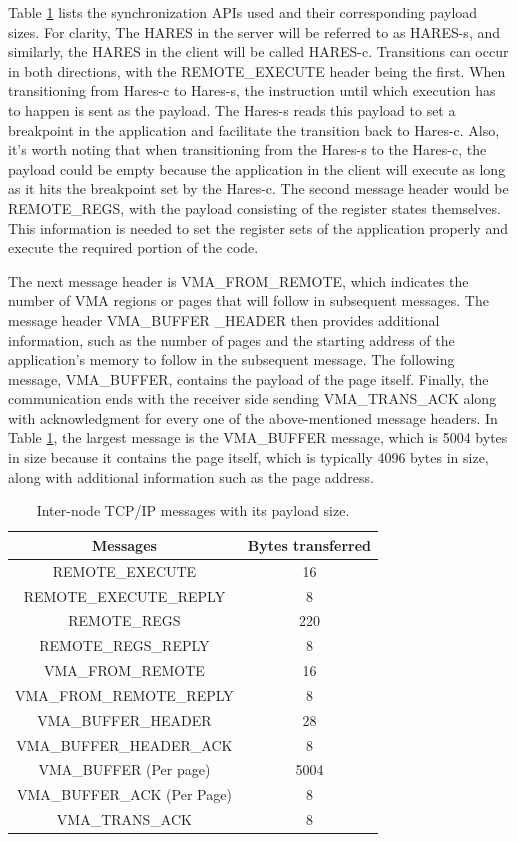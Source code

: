 \documentclass[article, doublespace,nopageskip]{VTthesis} %
\newcommand{\monitor}{HARES }
\begin{document}
    Table \ref{t:TPayload} lists the synchronization APIs used and their corresponding payload sizes. For clarity, The \monitor in the server will be referred to as HARES-s, and similarly, the \monitor in the client will be called HARES-c. Transitions can occur in both directions, with the REMOTE\_EXECUTE header being the first.  When transitioning from Hares-c to Hares-s, the instruction until which execution has to happen is sent as the payload. The Hares-s reads this payload to set a breakpoint in the application and facilitate the transition back to Hares-c. Also, it’s worth noting that when transitioning from the Hares-s to the Hares-c, the payload could be empty because the application in the client will execute as long as it hits the breakpoint set by the Hares-c. The second message header would be
    REMOTE\_REGS, with the payload consisting of the register states themselves. This information is needed to set the register sets of the application properly and execute the required portion of the code.
    
    The next message header is VMA\_FROM\_REMOTE, which indicates the number of VMA regions or pages that will follow in subsequent messages. The message header VMA\_BUFFER \_HEADER then provides additional information, such as the number of pages and the starting address of the application’s memory to follow in the subsequent message. The following message, VMA\_BUFFER, contains the payload of the page itself. Finally, the communication ends with the receiver side sending VMA\_TRANS\_ACK along with acknowledgment for every
    one of the above-mentioned message headers. In Table \ref{t:TPayload}, the largest message is the VMA\_BUFFER message, which is 5004 bytes in size
    because it contains the page itself, which is typically 4096 bytes in size, along with additional information such as the page address.

    \begin{table}[h]
	\centering
	\footnotesize
	\caption{Inter-node TCP/IP messages with its payload size.}
	\begin{tabular}{| c | c |} \hline
		  Messages & Bytes transferred\\ \hline \hline
        REMOTE\_EXECUTE  &  16 \\ \hline
        REMOTE\_EXECUTE\_REPLY  &  8 \\  \hline
        REMOTE\_REGS &  220 \\  \hline
        REMOTE\_REGS\_REPLY & 8 \\ \hline
        VMA\_FROM\_REMOTE &  16 \\ \hline
        VMA\_FROM\_REMOTE\_REPLY &  8\\ \hline
        VMA\_BUFFER\_HEADER & 28 \\ \hline
        VMA\_BUFFER\_HEADER\_ACK & 8 \\ \hline
        VMA\_BUFFER (Per page) & 5004\\ \hline
        VMA\_BUFFER\_ACK (Per Page) & 8 \\ \hline
        VMA\_TRANS\_ACK & 8\\ \hline
	\end{tabular}
	\label{t:TPayload}
    \end{table}
\end{document}
